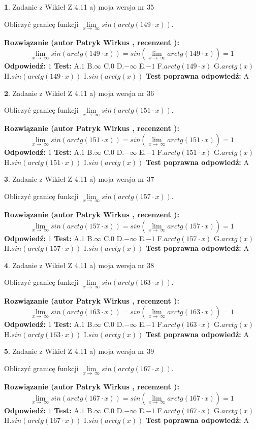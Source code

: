 \documentclass[12pt, a4paper]{article}
\theoremstyle{definition} %
\newtheorem{zad}{}
\newcommand{\zadStart}[1]{\begin{zad}#1\newline}
\newcommand{\zadStop}{\end{zad}}
\newcommand{\rozwStart}[2]{\noindent \textbf{Rozwiązanie (autor #1 , recenzent #2): }\newline}
\newcommand{\rozwStop}{\newline}
\newcommand{\odpStart}{\noindent \textbf{Odpowiedź:}\newline}
\newcommand{\odpStop}{\newline}
\newcommand{\testStart}{\noindent \textbf{Test:}\newline}
\newcommand{\testStop}{\newline}
\newcommand{\kluczStart}{\noindent \textbf{Test poprawna odpowiedź:}\newline}
\newcommand{\kluczStop}{\newline}
\begin{document}
\zadStart{Zadanie z Wikieł Z 4.11 a) moja wersja nr 35}

Obliczyć granicę funkcji  $\lim\limits_{x\to\ \infty}sin(arctg(149\cdot x))$.
\zadStop
\rozwStart{Patryk Wirkus}{}
$$\lim\limits_{x\to\ \infty}sin(arctg(149\cdot x)) = sin(\lim\limits_{x\to\ \infty}arctg(149\cdot x)) = 1$$
\rozwStop
\odpStart
$1$
\odpStop
\testStart
A.$1$ B.$\infty$ C.$0$ D.$-\infty$ E.$-1$
F.$arctg(149\cdot x)$ G.$arctg(x)$
H.$sin(arctg(149\cdot x))$
I.$sin(arctg(x))$
\testStop
\kluczStart
A
\kluczStop



\zadStart{Zadanie z Wikieł Z 4.11 a) moja wersja nr 36}

Obliczyć granicę funkcji  $\lim\limits_{x\to\ \infty}sin(arctg(151\cdot x))$.
\zadStop
\rozwStart{Patryk Wirkus}{}
$$\lim\limits_{x\to\ \infty}sin(arctg(151\cdot x)) = sin(\lim\limits_{x\to\ \infty}arctg(151\cdot x)) = 1$$
\rozwStop
\odpStart
$1$
\odpStop
\testStart
A.$1$ B.$\infty$ C.$0$ D.$-\infty$ E.$-1$
F.$arctg(151\cdot x)$ G.$arctg(x)$
H.$sin(arctg(151\cdot x))$
I.$sin(arctg(x))$
\testStop
\kluczStart
A
\kluczStop



\zadStart{Zadanie z Wikieł Z 4.11 a) moja wersja nr 37}

Obliczyć granicę funkcji  $\lim\limits_{x\to\ \infty}sin(arctg(157\cdot x))$.
\zadStop
\rozwStart{Patryk Wirkus}{}
$$\lim\limits_{x\to\ \infty}sin(arctg(157\cdot x)) = sin(\lim\limits_{x\to\ \infty}arctg(157\cdot x)) = 1$$
\rozwStop
\odpStart
$1$
\odpStop
\testStart
A.$1$ B.$\infty$ C.$0$ D.$-\infty$ E.$-1$
F.$arctg(157\cdot x)$ G.$arctg(x)$
H.$sin(arctg(157\cdot x))$
I.$sin(arctg(x))$
\testStop
\kluczStart
A
\kluczStop



\zadStart{Zadanie z Wikieł Z 4.11 a) moja wersja nr 38}

Obliczyć granicę funkcji  $\lim\limits_{x\to\ \infty}sin(arctg(163\cdot x))$.
\zadStop
\rozwStart{Patryk Wirkus}{}
$$\lim\limits_{x\to\ \infty}sin(arctg(163\cdot x)) = sin(\lim\limits_{x\to\ \infty}arctg(163\cdot x)) = 1$$
\rozwStop
\odpStart
$1$
\odpStop
\testStart
A.$1$ B.$\infty$ C.$0$ D.$-\infty$ E.$-1$
F.$arctg(163\cdot x)$ G.$arctg(x)$
H.$sin(arctg(163\cdot x))$
I.$sin(arctg(x))$
\testStop
\kluczStart
A
\kluczStop



\zadStart{Zadanie z Wikieł Z 4.11 a) moja wersja nr 39}

Obliczyć granicę funkcji  $\lim\limits_{x\to\ \infty}sin(arctg(167\cdot x))$.
\zadStop
\rozwStart{Patryk Wirkus}{}
$$\lim\limits_{x\to\ \infty}sin(arctg(167\cdot x)) = sin(\lim\limits_{x\to\ \infty}arctg(167\cdot x)) = 1$$
\rozwStop
\odpStart
$1$
\odpStop
\testStart
A.$1$ B.$\infty$ C.$0$ D.$-\infty$ E.$-1$
F.$arctg(167\cdot x)$ G.$arctg(x)$
H.$sin(arctg(167\cdot x))$
I.$sin(arctg(x))$
\testStop
\kluczStart
A
\kluczStop
\end{document}
